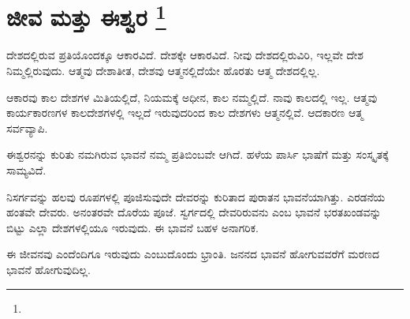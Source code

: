 
\chapter[ಜೀವ ಮತ್ತು ಈಶ್ವರ ]{ಜೀವ ಮತ್ತು ಈಶ್ವರ \protect\footnote{}}

ದೇಶದಲ್ಲಿರುವ ಪ್ರತಿಯೊಂದಕ್ಕೂ ಆಕಾರವಿದೆ. ದೇಶಕ್ಕೇ ಆಕಾರವಿದೆ. ನೀವು ದೇಶದಲ್ಲಿರುವಿರಿ, ಇಲ್ಲವೇ ದೇಶ ನಿಮ್ಮಲ್ಲಿರುವುದು. ಆತ್ಮವು ದೇಶಾತೀತ, ದೇಶವು ಆತ್ಮನಲ್ಲಿದೆಯೇ ಹೊರತು ಆತ್ಮ ದೇಶದಲ್ಲಿಲ್ಲ.

ಆಕಾರವು ಕಾಲ ದೇಶಗಳ ಮಿತಿಯಲ್ಲಿದೆ, ನಿಯಮಕ್ಕೆ ಅಧೀನ, ಕಾಲ ನಮ್ಮಲ್ಲಿದೆ. ನಾವು ಕಾಲದಲ್ಲಿ ಇಲ್ಲ. ಆತ್ಮವು ಕಾರ್ಯಕಾರಣಗಳ ಕಾಲದೇಶಗಳಲ್ಲಿ ಇಲ್ಲದೆ ಇರುವುದರಿಂದ ಕಾಲ ದೇಶಗಳು ಆತ್ಮನಲ್ಲಿವೆ. ಆದಕಾರಣ ಆತ್ಮ ಸರ್ವವ್ಯಾಪಿ.

ಈಶ್ವರನನ್ನು ಕುರಿತು ನಮಗಿರುವ ಭಾವನೆ ನಮ್ಮ ಪ್ರತಿಬಿಂಬವೇ ಆಗಿದೆ. ಹಳೆಯ ಪಾರ್ಸಿ ಭಾಷೆಗೆ ಮತ್ತು ಸಂಸ್ಕೃತಕ್ಕೆ ಸಾಮ್ಯವಿದೆ.

ನಿಸರ್ಗವನ್ನು ಹಲವು ರೂಪಗಳಲ್ಲಿ ಪೂಜಿಸುವುದೇ ದೇವರನ್ನು ಕುರಿತಾದ ಪುರಾತನ ಭಾವನೆಯಾಗಿತ್ತು. ಎರಡನೆಯ ಹಂತವೇ ದೇವರು. ಅನಂತರವೇ ದೊರೆಯ ಪೂಜೆ. ಸ್ವರ್ಗದಲ್ಲಿ ದೇವರಿರುವನು ಎಂಬ ಭಾವನೆ ಭರತಖಂಡವನ್ನು ಬಿಟ್ಟು ಎಲ್ಲಾ ದೇಶಗಳಲ್ಲಿಯೂ ಇರುವುದು. ಈ ಭಾವನೆ ಬಹಳ ಅನಾಗರಿಕ.

ಈ ಜೀವನವು ಎಂದೆಂದಿಗೂ ಇರುವುದು ಎಂಬುದೊಂದು ಭ್ರಾಂತಿ. ಜನನದ ಭಾವನೆ ಹೋಗುವವರೆಗೆ ಮರಣದ ಭಾವನೆ ಹೋಗುವುದಿಲ್ಲ.

